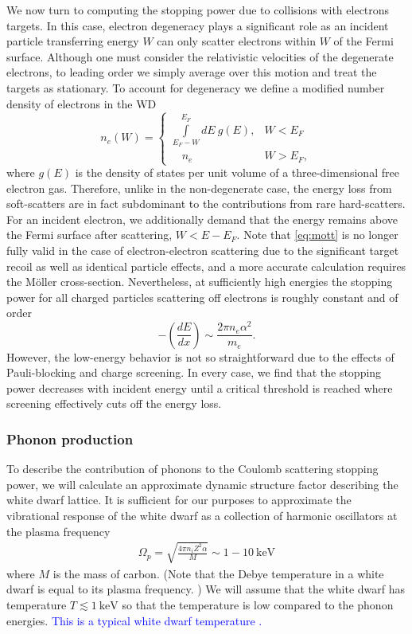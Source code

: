 \documentclass[twocolumn,preprintnumbers,amsmath,amssymb,prl, superscriptaddress]{revtex4}
\def\r{\right)}
\def\l{\left(}
\begin{document}
\begin{appendices}
We now turn to computing the stopping power due to collisions with electrons targets.
In this case, electron degeneracy plays a significant role as an incident particle transferring energy $W$ can only scatter electrons within $W$ of the Fermi surface.
Although one must consider the relativistic velocities of the degenerate electrons, to leading order we simply average over this motion and treat the targets as stationary.
To account for degeneracy we define a modified number density of electrons in the WD
\begin{equation}
\label{eq:pauliblocking}
  n_e \l W \r =
  \begin{cases}
    \displaystyle \int \limits_{E_F - W}^{E_F} dE ~g(E), &  W < E_F  \\
    \quad             n_e                                &  W > E_F,
  \end{cases}
\end{equation}
where $g(E)$ is the density of states per unit volume of a three-dimensional free electron gas.
Therefore, unlike in the non-degenerate case, the energy loss from soft-scatters are in fact subdominant to the contributions from rare hard-scatters.
For an incident electron, we additionally demand that the energy remains above the Fermi surface after scattering, $W < E - E_F$.
Note that \eqref{eq:mott} is no longer fully valid in the case of electron-electron scattering due to the significant target recoil as well as identical particle effects, and a more accurate calculation requires the M{\"o}ller cross-section.
Nevertheless, at sufficiently high energies the stopping power for all charged particles scattering off electrons is roughly constant and of order
\begin{equation}
-\l \frac{dE}{dx} \r \sim \frac{2 \pi n_e \alpha^2}{m_e}.
\end{equation}
However, the low-energy behavior is not so straightforward due to the effects of Pauli-blocking and charge screening.
In every case, we find that the stopping power decreases with incident energy until a critical threshold is reached where screening effectively cuts off the energy loss.

\subsubsection{Phonon production}

To describe the contribution of phonons to the Coulomb scattering stopping power, we will calculate an approximate dynamic structure factor describing the white dwarf lattice. It is sufficient for our purposes to approximate the vibrational response of the white dwarf as a collection of harmonic oscillators at the plasma frequency
\begin{align}
\Omega_p = \sqrt{\frac{4 \pi n_i Z^2 \alpha}{M}} \sim 1 - 10~\text{keV}
\end{align}
where $M$ is the mass of carbon. (Note that the Debye temperature in a white dwarf is equal to its plasma frequency. \cite{reference}) We will assume that the white dwarf has temperature $T\lesssim 1~\text{keV}$ so that the temperature is low compared to the phonon energies. \textcolor{blue}{This is a typical white dwarf temperature \cite{reference}.}


\end{appendices}
\end{document}
